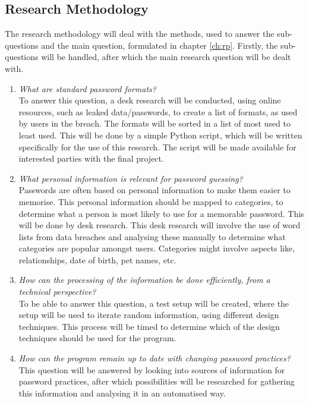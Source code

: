 \documentclass[a4paper,12pt]{article}
\begin{document}
\subsection{Research Methodology}

The research methodology will deal with the methods, used to answer the sub-questions and the main question, formulated in chapter \ref{ch:rp}. Firstly, the sub-questions will be handled, after which the main research question will be dealt with.

\begin{enumerate}
\item \textit{What are standard password formats?}\\
  To answer this question, a desk research will be conducted, using online resources, such as leaked data/passwords, to create a list of formats, as used by users in the breach. The formats will be sorted in a list of most used to least used. This will be done by a simple Python script, which will be written specifically for the use of this research. The script will be made available for interested parties with the final project.
  
\item \textit{What personal information is relevant for password guessing?}\\
  Passwords are often based on personal information to make them easier to memorise. This personal information should be mapped to categories, to determine what a person is most likely to use for a memorable password. This will be done by desk research. This desk research will involve the use of word lists from data breaches and analysing these manually to determine what categories are popular amongst users. Categories might involve aspects like, relationships, date of birth, pet names, etc.
  
\item \textit{How can the processing of the information be done efficiently, from a technical perspective?}\\
  To be able to answer this question, a test setup will be created, where the setup will be used to iterate random information, using different design techniques. This process will be timed to determine which of the design techniques should be used for the program.

\item \textit{How can the program remain up to date with changing password practices?}
  This question will be answered by looking into sources of information for password practices, after which possibilities will be researched for gathering this information and analysing it in an automatised way.
\end{enumerate}
\end{document}

